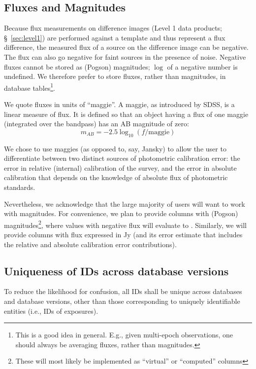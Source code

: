 \documentclass[SE,lsstdraft,toc]{lsstdoc}
\newcommand{\marginreq}[1]{\marginpar{\hspace{0pt}\tiny #1}}
\newcommand{\dmreq}[1]{\marginreq{DMS-REQ-#1}}
\begin{document}
\subsection{Fluxes and Magnitudes}
\label{sec:fluxes}
\dmreq{0043}
Because flux measurements on difference images (Level 1 data products; \S~\ref{sec:level1}) are performed against a template
and thus represent a flux difference, the measured flux of a source on the difference image can be negative. The flux can also go negative for faint sources in the presence of noise. Negative fluxes cannot be stored as (Pogson) magnitudes; $\log$ of a negative number is undefined. We therefore prefer to store fluxes, rather than magnitudes, in database tables\footnote{This is a good idea in general. E.g., given multi-epoch observations, one should always be averaging fluxes, rather than magnitudes.}.\dmreq{0347}

We quote fluxes in units of ``maggie''. A maggie, as introduced by SDSS, is a linear measure of flux. It is defined so that an object having a flux of one maggie (integrated over the bandpass) has an AB magnitude of zero:
\begin{equation}
    m_{AB} = -2.5 \log_{10}(f/\mathrm{maggie})
\end{equation}

We chose to use maggies (as opposed to, say, Jansky) to allow the user to differentiate between two distinct sources of photometric calibration error: the error in relative (internal) calibration of the survey, and the error in absolute calibration that depends on the knowledge of absolute flux of photometric standards.

\vspace{1em}
Nevertheless, we acknowledge that the large majority of users will want to work with magnitudes. For convenience, we plan to provide columns with (Pogson) magnitudes\footnote{These will most likely be implemented as ``virtual'' or ``computed'' columns}, where values with negative flux will evaluate to . Similarly, we will provide columns with flux expressed in Jy (and its error estimate that includes the relative and absolute calibration error contributions).

\subsection{Uniqueness of IDs across database versions}

\dmreq{0292}
To reduce the likelihood for confusion, all IDs shall be unique across databases and database versions, other than those corresponding to uniquely identifiable entities (i.e., IDs of exposures).
\end{document}
